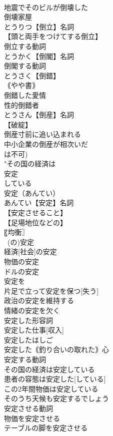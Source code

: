 \documentclass[8pt]{extreport}
\begin{document}
\begin{CJK}{UTF8}{min}
\\	地震でそのビルが倒壊した
\\	倒壊家屋
\\	とうりつ【倒立】名詞
\\	【頭と両手をつけてする倒立】
\\	倒立する動詞
\\	とうかく【倒閣】名詞
\\	倒閣する動詞
\\	とうさく【倒錯】
\\	｟やや書｠
\\	倒錯した愛情
\\	性的倒錯者
\\	とうさん【倒産】名詞
\\	【破綻】
\\	倒産寸前に追い込まれる
\\	中小企業の倒産が相次いだ
\\	は不可)
\\	"その国の経済は
\\	安定
\\	している
\\	安定（あんてい）
\\	あんてい【安定】名詞
\\	【安定させること】
\\	【足場地位などの】
\\	〖均衡〗
\\	~(の)安定
\\	経済[社会]の安定
\\	物価の安定
\\	ドルの安定
\\	安定を
\\	片足で立って安定を保つ[失う]
\\	政治の安定を維持する
\\	情緒の安定を欠く
\\	安定した形容詞
\\	安定した仕事[収入]
\\	安定したはしご
\\	安定した｟釣り合いの取れた｠心
\\	安定する動詞
\\	その国の経済は安定している
\\	患者の容態は安定した[している]
\\	この2年間物価は安定している
\\	そのうち天候も安定するでしょう
\\	安定させる動詞
\\	物価を安定させる
\\	テーブルの脚を安定させる

\end{CJK}
\end{document}
